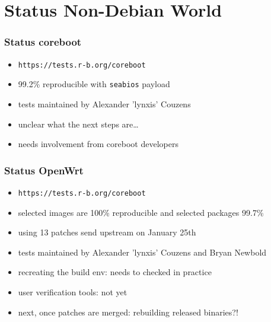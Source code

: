\documentclass[14pt]{beamer}
\newif\ifplacelogo
\begin{document}
\section{Status Non-Debian World}

\placelogofalse

\begin{frame}
 \frametitle{Status coreboot}
 \begin{itemize}
  \item \texttt{https://tests.r-b.org/coreboot}
  \item 99.2\% reproducible with \texttt{seabios} payload
  \item tests maintained by Alexander 'lynxis' Couzens
  \item unclear what the next steps are…
  \item needs involvement from coreboot developers
 \end{itemize}
\end{frame}

\begin{frame}
 \frametitle{Status OpenWrt}
 \begin{itemize}
  \item \texttt{https://tests.r-b.org/coreboot}
  \item selected images are 100\% reproducible and selected packages 99.7\%
  \item using 13 patches send upstream on January 25th
  \item tests maintained by Alexander 'lynxis' Couzens and Bryan Newbold
  \item recreating the build env: needs to checked in practice
  \item user verification tools: not yet
  \item next, once patches are merged: rebuilding released binaries?!
 \end{itemize}
\end{frame}
\end{document}
